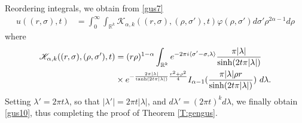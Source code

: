 \documentclass[11pt,a4paper]{amsart}
\def \R {\mathbb{R}}
\def \vf{\varphi}
\newcommand{\la}{\lambda}
\numberwithin{equation}{section}
\newcommand{\sa}{\langle}
\newcommand{\da}{\rangle}
\numberwithin{equation}{section}
\begin{document}
Reordering integrals, we obtain from \eqref{gus7}
\begin{align}\label{gus8}
u((r,\sigma),t) & = \int_0^\infty \int_{\R^k}\mathscr K_{\alpha,k}((r,\sigma),(\rho,\sigma'),t)  \vf(\rho,\sigma')   d\sigma' \rho^{2\alpha-1} d\rho
\end{align}
where
\begin{align*}\label{gus9}
\mathscr K_{\alpha,k}((r,\sigma),(\rho,\sigma'),t) & = (r\rho)^{1-\alpha}  \int_{\R^k} e^{-2\pi i\sa \sigma'-\sigma,\la\da} \frac{\pi |\la|}{\sinh(2t \pi |\la|)}
\\
& \times  e^{-\frac{2\pi |\la|}{\tanh(2t \pi |\la|)} \frac{r^2 +\rho^2}4} I_{\alpha - 1}(\frac{\pi |\la| \rho r}{\sinh(2t\pi |\la|)})\ d\la. 
\notag
\end{align*}
Setting $\la'=2\pi t\la$, so that $|\la'| = 2\pi t |\la|$, and $d\la' = (2\pi t)^k d\la$, we finally obtain \eqref{gus10}, thus completing the proof of Theorem \ref{T:gengus}.

\medskip
\end{document}
